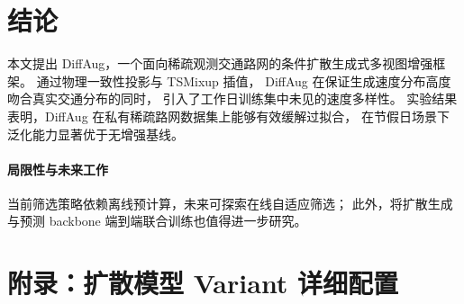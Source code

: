\documentclass[12pt]{article}
\begin{document}
\section{结论}
\label{sec:conclusion}

本文提出 DiffAug，一个面向稀疏观测交通路网的条件扩散生成式多视图增强框架。
通过物理一致性投影与 TSMixup 插值，
DiffAug 在保证生成速度分布高度吻合真实交通分布的同时，
引入了工作日训练集中未见的速度多样性。
实验结果表明，DiffAug 在私有稀疏路网数据集上能够有效缓解过拟合，
在节假日场景下泛化能力显著优于无增强基线。

\paragraph{局限性与未来工作}
当前筛选策略依赖离线预计算，未来可探索在线自适应筛选；
此外，将扩散生成与预测 backbone 端到端联合训练也值得进一步研究。




\appendix
\section{附录：扩散模型 Variant 详细配置}
\end{document}
